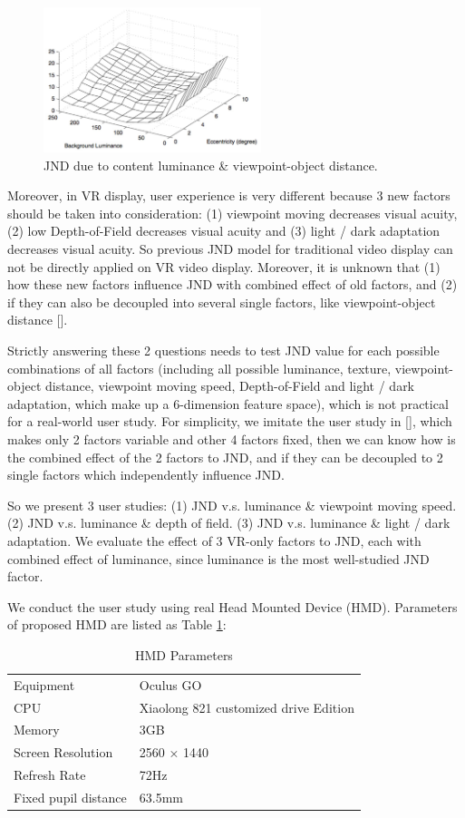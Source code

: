 \begin{figure}
  \centering
  \includegraphics[width=2.5in]{images/JNDlum-dist.jpg}
  \caption{JND due to content luminance \& viewpoint-object distance.}
  \label{JNDlum-dist}
  \end{figure}

Moreover, in VR display, user experience is very different because 3 new factors should be taken into consideration: (1) viewpoint moving decreases visual acuity, (2) low Depth-of-Field decreases visual acuity and (3) light / dark adaptation decreases visual acuity. So previous JND model for traditional video display can not be directly applied on VR video display. Moreover, it is unknown that (1) how these new factors influence JND with combined effect of old factors, and (2) if they can also be decoupled into several single factors, like viewpoint-object distance [].

Strictly answering these 2 questions needs to test JND value for each possible combinations of all factors (including all possible luminance, texture, viewpoint-object distance, viewpoint moving speed, Depth-of-Field and light / dark adaptation, which make up a 6-dimension feature space), which is not practical for a real-world user study. For simplicity, we imitate the user study in [], which makes only 2 factors variable and other 4 factors fixed, then we can know how is the combined effect of the 2 factors to JND, and if they can be decoupled to 2 single factors which independently influence JND.

So we present 3 user studies: (1) JND v.s. luminance \& viewpoint moving speed. (2) JND v.s. luminance \& depth of field. (3) JND v.s. luminance \& light / dark adaptation. We evaluate the effect of 3 VR-only factors to JND, each with combined effect of luminance, since luminance is the most well-studied JND factor.

We conduct the user study using real Head Mounted Device (HMD). Parameters of proposed HMD are listed as Table \ref{table1}:

\begin{table}[h]
\centering
\caption{HMD Parameters}\label{table1}
\begin{tabular}{|p{3.5cm}|p{3.5cm}|}
\hline
Equipment & Oculus GO\\
CPU & Xiaolong 821 customized drive Edition\\
Memory & 3GB\\
Screen Resolution & 2560 × 1440\\
Refresh Rate & 72Hz\\
Fixed pupil distance & 63.5mm\\
\hline
\end{tabular}
\end{table}

